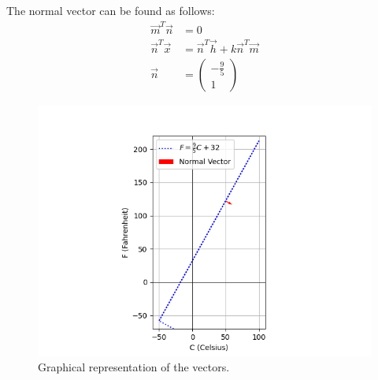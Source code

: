 \documentclass[journal]{IEEEtran}
\begin{document}
The normal vector can be found as follows:
\begin{align}
	\vec{m}^{T} \vec{n} &= 0 \\
	\vec{n}^{T} \vec{x} &= \vec{n}^{T} \vec{h} + k\vec{n}^{T} \vec{m} \\
	\vec{n} &= \begin{pmatrix} -\frac{9}{5} \\ 1 \end{pmatrix}
\end{align}

\begin{figure}[h!]
    \centering
    \includegraphics[width = 1\linewidth]{figs/fig.png}
    \caption{Graphical representation of the vectors.}
    \label{stemplot}
\end{figure}
\end{document}
